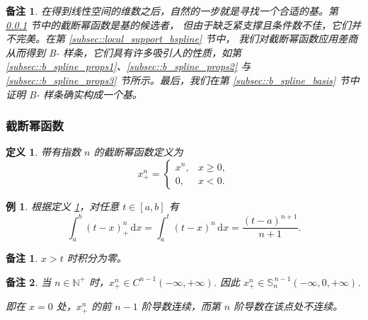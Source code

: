 \documentclass[a4paper]{ctexart}
\newtheorem{remark}{备注}
\newtheorem*{remark*}{备注}
\newtheorem{definition}[theorem]{定义} %
\newtheorem{example}[theorem]{例}
\numberwithin{theorem}{section}
\numberwithin{equation}{section}
\numberwithin{figure}{section}
\numberwithin{remark}{section}
\begin{document}
\begin{remark}
    \label{rem::after_dim_find_basis}
在得到线性空间的维数之后，自然的一步就是寻找一个合适的基。第 \ref{subsec::truncated_power_functions} 节中的截断幂函数是基的候选者，
但由于缺乏紧支撑且条件数不佳，它们并不完美。在第 \ref{subsec::local_support_bspline} 节中，
我们对截断幂函数应用差商从而得到 B- 样条，它们具有许多吸引人的性质，如第 \ref{subsec::b_spline_props1}、\ref{subsec::b_spline_props2} 
与 \ref{subsec::b_spline_props3} 节所示。最后，我们在第 \ref{subsec::b_spline_basis} 节中证明 B- 样条确实构成一个基。
\end{remark}

\subsubsection{截断幂函数}
\label{subsec::truncated_power_functions}

\begin{definition}
    \label{def::truncated_power}
带有指数 $n$ 的截断幂函数定义为
\begin{equation}
    \label{eq::truncated_power}    
x^{n}_{+}=
\begin{cases}
x^{n}, & x\ge 0,\\
0,     & x<0.
\end{cases}
\end{equation}

\end{definition}

\begin{example}
    \label{ex::tp_int}
根据定义 \ref{def::truncated_power}，对任意 $t\in[a,b]$ 有
\begin{equation}
    \label{eq::tp_int}
\int_{a}^{b}(t-x)_{+}^{n}\,\mathrm{d}x
=\int_{a}^{t}(t-x)^{n}\,\mathrm{d}x
=\frac{(t-a)^{n+1}}{n+1}.
\end{equation}
\end{example}

\begin{remark*}
    $x > t$ 时积分为零。
\end{remark*}

\begin{remark}
    \label{rem::tp_smooth}
当 $n\in\mathbb{N}^{+}$ 时，$x_{+}^{n}\in C^{n-1}(-\infty,+\infty)$. 
因此
$x_{+}^{n}\in \mathbb{S}^{\,n-1}_{n}(-\infty,0,+\infty)$.

即在 $x = 0$ 处，$x_{+}^{n}$ 的前 $n-1$ 阶导数连续，而第 $n$ 阶导数在该点处不连续。
\end{remark}
\end{document}
